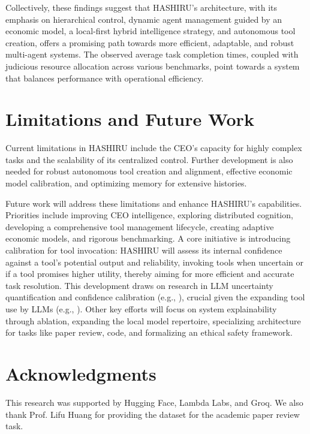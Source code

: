 \documentclass[conference]{IEEEtran}
\begin{document}
Collectively, these findings suggest that HASHIRU's architecture, with its emphasis on hierarchical control, dynamic agent management guided by an economic model, a local-first hybrid intelligence strategy, and autonomous tool creation, offers a promising path towards more efficient, adaptable, and robust multi-agent systems. The observed average task completion times, coupled with judicious resource allocation across various benchmarks, point towards a system that balances performance with operational efficiency.

\section{Limitations and Future Work}
\label{sec:limitations_future_work}

Current limitations in HASHIRU include the CEO's capacity for highly complex tasks and the scalability of its centralized control. Further development is also needed for robust autonomous tool creation and alignment, effective economic model calibration, and optimizing memory for extensive histories.

Future work will address these limitations and enhance HASHIRU's capabilities. Priorities include improving CEO intelligence, exploring distributed cognition, developing a comprehensive tool management lifecycle, creating adaptive economic models, and rigorous benchmarking. A core initiative is introducing calibration for tool invocation: HASHIRU will assess its internal confidence against a tool's potential output and reliability, invoking tools when uncertain or if a tool promises higher utility, thereby aiming for more efficient and accurate task resolution. This development draws on research in LLM uncertainty quantification and confidence calibration (e.g., \cite{manggalaqa, spiess2024calibration}), crucial given the expanding tool use by LLMs (e.g., \cite{Qin2023ToolLLM}). Other key efforts will focus on system explainability through ablation, expanding the local model repertoire, specializing architecture for tasks like paper review, code, and formalizing an ethical safety framework.

\section*{Acknowledgments}

This research was supported by Hugging Face, Lambda Labs, and Groq. We also thank Prof. Lifu Huang for providing the dataset for the academic paper review task.
\end{document}
